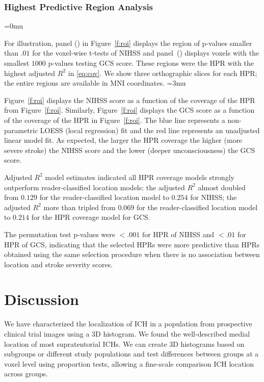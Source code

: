 \ifseverity
\subsubsection{Highest Predictive Region Analysis}




\thinmuskip=0mu


For illustration, panel (\protect{}) in Figure~\ref{f:roi} displays the region of p-values smaller than $.01$ for the voxel-wise t-tests of NIHSS and panel~(\protect{}) displays voxels with the smallest $1000$ p-values testing GCS score. These regions were the HPR with the highest adjusted $R^2$ in \eqref{eq:cov}. We show three orthographic slices for each HPR; the entire regions are available in MNI coordinates. 
\thinmuskip=3mu

Figure~\ref{f:roi}\protect{} displays the NIHSS score as a function of the coverage of the HPR from Figure~\ref{f:roi}\protect{}. Similarly, Figure~\ref{f:roi}\protect{} displays the GCS score as a function of the coverage of the HPR in Figure~\ref{f:roi}\protect{}.  The blue line represents a non-parametric LOESS (local regression) \citep{cleveland_local_1992} fit and the red line represents an unadjusted linear model fit.  As expected, the larger the HPR coverage the higher (more severe stroke) the NIHSS score and the lower (deeper unconsciousness) the GCS score.

Adjusted $R^2$ model estimates indicated all HPR coverage models strongly outperform reader-classified location models: the adjusted $R^2$ almost doubled from $0.129$  for the reader-classified location model to $0.254$ for NIHSS; the adjusted $R^2$ more than tripled from $0.069$ for the reader-classified location model to $0.214$ for the HPR coverage model for GCS. 

The permutation test p-values were $<.001$ for HPR of NIHSS and $<.01$ for HPR of GCS, indicating that the selected HPRs were more predictive than HPRs obtained using the same selection procedure when there is no association between location and stroke severity scores. 
\fi

\section{Discussion}

We have characterized the localization of ICH in a population from prospective clinical trial images using a 3D histogram. We found the well-described medial location of most supratentorial ICHs.   We can create 3D histograms based on subgroups or different study populations and test differences between groups at a voxel level using proportion tests, allowing a fine-scale comparison ICH location across groups.

